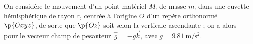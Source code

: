 \documentclass[a4paper,french,bookmarks]{article}
\begin{document}
    \renewcommand{\thesection}{\Roman{section}} 
    \renewcommand{\thesubsection}{\thesection.\Alph{subsection}}
    \renewcommand{\labelenumi}{\thesection.\arabic{enumi}.}
    \renewcommand*{\labelenumii}{\alph{enumii}.}
    \renewcommand*{\labelenumiii}{\alph{enumiii}.}
    
    \newcommand{\ON}{\mathbf{ON}}
    
    
    On considère le mouvement d'un point matériel $M$, de masse $m$, dans une cuvette hémisphérique de rayon $r$, centrée à l'origine $O$ d'un repère orthonormé $\p{Oxyz}$, de sorte que $\p{Oz}$ soit selon la verticale ascendante ; on a alors pour le vecteur champ de pesanteur $\vec{g} = -g\vec k$, avec $g = \qty{9.81}{\meter \per \second \squared}$.
    
\end{document}
